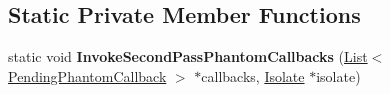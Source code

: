 \subsection*{Static Private Member Functions}
\begin{DoxyCompactItemize}
\item 
static void {\bfseries Invoke\+Second\+Pass\+Phantom\+Callbacks} (\hyperlink{classv8_1_1internal_1_1_list}{List}$<$ \hyperlink{classv8_1_1internal_1_1_global_handles_1_1_pending_phantom_callback}{Pending\+Phantom\+Callback} $>$ $\ast$callbacks, \hyperlink{classv8_1_1internal_1_1_isolate}{Isolate} $\ast$isolate)\hypertarget{classv8_1_1internal_1_1_global_handles_ae4d67624f0c80ca94829bfd315a88f38}{}\label{classv8_1_1internal_1_1_global_handles_ae4d67624f0c80ca94829bfd315a88f38}

\end{DoxyCompactItemize}
